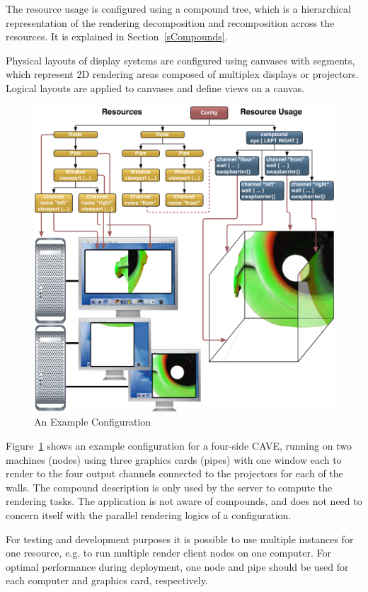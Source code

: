 \documentclass[10pt,a4]{scrartcl}
\newcommand{\fig}[1]{Figure~\ref{#1}}
\newcommand{\sref}[1]{Section~\ref{#1}}
\begin{document}
The resource usage is configured using a compound tree, which is a
hierarchical representation of the rendering decomposition and
recomposition across the resources. It is explained in \sref{sCompounds}.

Physical layouts of display systems are configured using canvases with
segments, which represent 2D rendering areas composed of multiplex
displays or projectors. Logical layouts are applied to canvases and
define views on a canvas.

\begin{figure}[ht!]\center
  \includegraphics[width=\textwidth]{images/cave.pdf}
  {\caption{\label{fConfig}An Example Configuration}}
\end{figure}

\fig{fConfig} shows an example configuration for a four-side
CAVE, running on two machines (nodes) using three graphics
cards (pipes) with one window each to render to the four output channels
connected to the projectors for each of the walls. The compound
description is only used by the server to compute the rendering
tasks. The application is not aware of compounds, and does not need to
concern itself with the parallel rendering logics of a configuration.

For testing and development purposes it is possible to use multiple
instances for one resource, e.g. to run multiple render client nodes on
one computer. For optimal performance during deployment, one node and
pipe should be used for each computer and graphics card, respectively.
\end{document}
